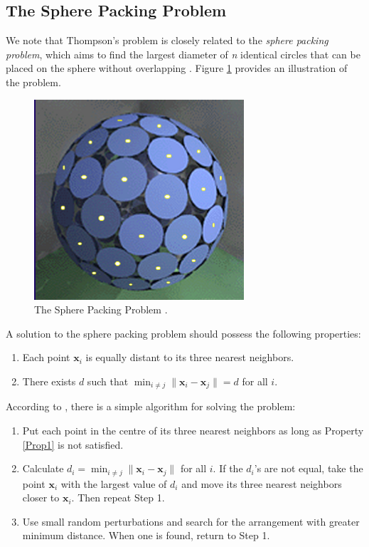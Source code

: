 \documentclass[11pt]{article}
\begin{document}
\subsection{The Sphere Packing Problem}

We note that Thompson's problem is closely related to the \emph{sphere packing problem}, which aims to find the largest diameter of \textit{n} identical circles that can be placed on the sphere without overlapping \cite{SpherePack}. Figure \ref{fig:SpherePack} provides an illustration of the problem.

\begin{figure}[!htb]
\centering
\includegraphics[width=0.5\columnwidth]{packing_problem.png}
\caption{The Sphere Packing Problem \cite{SpherePack}.}
\label{fig:SpherePack}
\end{figure}

A solution to the sphere packing problem should possess the following properties:
\begin{enumerate}[label=\arabic{*})]
	\item Each point $\bm{x}_i$ is equally distant to its three nearest neighbors.\label{Prop1}
	\item There exists $d$ such that $\min_{i \neq j} \| \bm{x}_i - \bm{x}_j \|= d$ for all $i$.
\end{enumerate}
According to \cite{SpherePack}, there is a simple algorithm for solving the problem:
\begin{enumerate}[label=\emph{Step \arabic{*}:}]
	\item Put each point in the centre of its three nearest neighbors as long as Property \ref{Prop1} is not satisfied.
	\item Calculate $d_i = \min_{i \neq j} \|\bm{x}_i - \bm{x}_j\|$ for all $i$. If the  $d_i$'s are not equal, take the point $\bm{x}_i$ with the largest value of $d_i$ and move its three nearest neighbors closer to $\bm{x}_i$. Then repeat Step 1.
	\item Use small random perturbations and search for the arrangement with greater minimum distance. When one is found, return to Step 1.
\end{enumerate}

\nocite{*}


\end{document}
